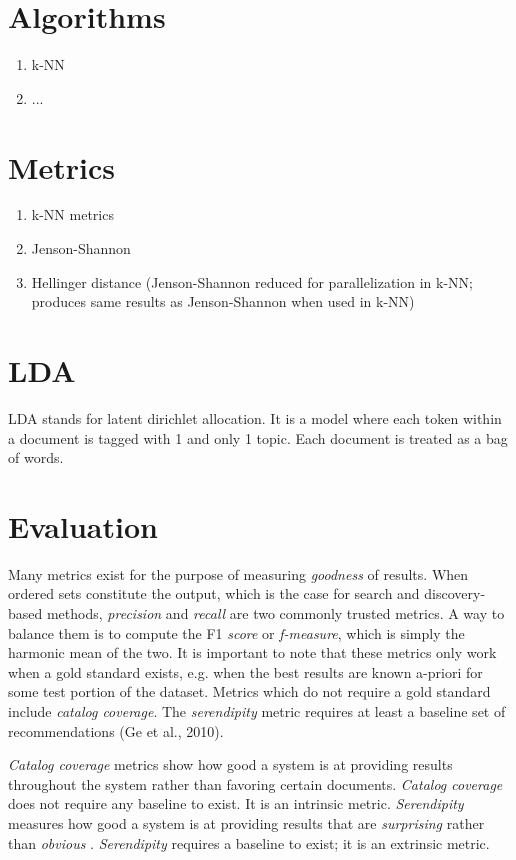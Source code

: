 \section{Algorithms}
\begin{enumerate}
  \item k-NN
  \item ...
\end{enumerate}

\section{Metrics}
\begin{enumerate}
  \item k-NN metrics
  \item Jenson-Shannon
  \item Hellinger distance (Jenson-Shannon reduced for parallelization in k-NN; produces same results as Jenson-Shannon when used in k-NN)
\end{enumerate}

\section{LDA}
LDA stands for latent dirichlet allocation. It is a model where each token within a document is tagged with 1 and only 1 topic. Each document is treated as a bag of words.

\section{Evaluation}

Many metrics exist for the purpose of measuring \textit{goodness} of results. When ordered sets constitute the output, which is the case for search and discovery-based methods, \textit{precision} and \textit{recall} are two commonly trusted metrics. A way to balance them is to compute the F1 \textit{score} or \textit{f-measure}, which is simply the harmonic mean of the two. It is important to note that these metrics only work when a gold standard exists, e.g. when the best results are known a-priori for some test portion of the dataset. Metrics which do not require a gold standard include \textit{catalog coverage}. The \textit{serendipity} metric requires at least a baseline set of recommendations (Ge et al., 2010).

\emph{Catalog coverage} metrics show how good a system is at providing results throughout the system rather than favoring certain documents. \emph{Catalog coverage} does not require any baseline to exist. It is an intrinsic metric. \emph{Serendipity} measures how good a system is at providing results that are \textit{surprising} rather than \textit{obvious} \citep{Ge:2010:BAE:1864708.1864761}. \emph{Serendipity} requires a baseline to exist; it is an extrinsic metric. %

